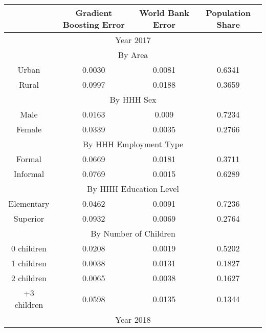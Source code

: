 \begin{table}[]
\begin{tabular}{@{}cccc@{}}
\toprule
            & Gradient Boosting Error & World Bank Error & Population Share \\ \midrule
\multicolumn{4}{c}{Year 2017}                                               \\ \midrule
\multicolumn{4}{c}{By Area}                                                 \\ \midrule
Urban       & 0.0030                  & 0.0081           & 0.6341           \\
Rural       & 0.0997                  & 0.0188           & 0.3659           \\ \midrule
\multicolumn{4}{c}{By HHH Sex}                                              \\ \midrule
Male        & 0.0163                  & 0.009            & 0.7234           \\
Female      & 0.0339                  & 0.0035           & 0.2766           \\ \midrule
\multicolumn{4}{c}{By HHH Employment Type}                                  \\ \midrule
Formal      & 0.0669                  & 0.0181           & 0.3711           \\
Informal    & 0.0769                  & 0.0015           & 0.6289           \\ \midrule
\multicolumn{4}{c}{By HHH Education Level}                                  \\ \midrule
Elementary  & 0.0462                  & 0.0091           & 0.7236           \\
Superior    & 0.0932                  & 0.0069           & 0.2764           \\ \midrule
\multicolumn{4}{c}{By Number of Children}                                   \\ \midrule
0 children  & 0.0208                  & 0.0019           & 0.5202           \\
1 children  & 0.0038                  & 0.0131           & 0.1827           \\
2 children  & 0.0065                  & 0.0038           & 0.1627           \\
+3 children & 0.0598                  & 0.0135           & 0.1344           \\ \midrule
\multicolumn{4}{c}{Year 2018}                                               \\ \midrule

\end{tabular}
\end{table}
